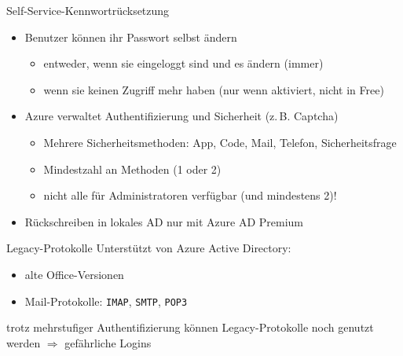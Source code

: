 

\begin{flashcard}[Definition]{Self-Service-Kennwortrücksetzung}
    \begin{itemize}
        \item Benutzer können ihr Passwort selbst ändern
            \begin{itemize}
                \item entweder, wenn sie eingeloggt sind und es ändern (immer)
                \item wenn sie keinen Zugriff mehr haben (nur wenn aktiviert, nicht in Free)
            \end{itemize}
        \item Azure verwaltet Authentifizierung und Sicherheit (z.\,B. Captcha)
            \begin{itemize}
                \item Mehrere Sicherheitsmethoden: App, Code, Mail, Telefon, Sicherheitsfrage
                \item Mindestzahl an Methoden (1 oder 2)
                \item nicht alle für Administratoren verfügbar (und mindestens 2)!
            \end{itemize}
        \item Rückschreiben in lokales AD nur mit Azure AD Premium
    \end{itemize}
\end{flashcard}


\begin{flashcard}[Definition]{Legacy-Protokolle}
    Unterstützt von Azure Active Directory:
    \begin{itemize}
        \item alte Office-Versionen
        \item Mail-Protokolle: \texttt{IMAP}, \texttt{SMTP}, \texttt{POP3}
    \end{itemize}
    \vspace{1cm}
    trotz mehrstufiger Authentifizierung können Legacy-Protokolle noch genutzt werden\newline
    $\Rightarrow$ gefährliche Logins
\end{flashcard}

